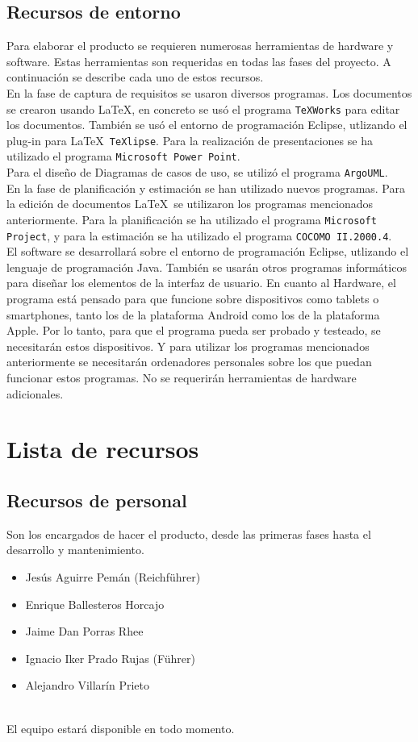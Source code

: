 \documentclass[spanish,a4paper,12pt]{report}	%
\begin{document}
		\subsection{Recursos de entorno}
			Para elaborar el producto se requieren numerosas herramientas de hardware y
			software. Estas herramientas son requeridas en todas las fases del proyecto. 
			A continuación se describe cada uno de estos recursos.  \\
			En la fase de captura de requisitos se usaron diversos programas. Los documentos
			se crearon usando \LaTeX , en concreto se usó el programa \texttt{TeXWorks} para editar los documentos.
			También se usó el entorno de programación Eclipse, utlizando el plug-in para \LaTeX\  \texttt{TeXlipse}. 
			Para la realización de presentaciones se ha utilizado el programa \texttt{Microsoft Power Point}.\\
			Para el diseño de Diagramas de casos de uso, se utilizó el programa \texttt{ArgoUML}.\\
			En la fase de planificación y estimación se han utilizado nuevos programas. Para la edición de documentos
			\LaTeX  \ se utilizaron los programas mencionados anteriormente. Para la planificación se ha utilizado el programa
			\texttt{Microsoft Project}, y para la estimación se ha utilizado el programa \texttt{COCOMO II.2000.4}.\\ 
			El software se desarrollará sobre el entorno de
			programación Eclipse, utlizando el lenguaje de programación Java. También se
			usarán otros programas informáticos para diseñar los elementos de la interfaz de
			usuario. En cuanto al Hardware, el programa está pensado para que funcione sobre dispositivos como
			tablets o smartphones, tanto los de la plataforma Android como los de la
			plataforma Apple. Por lo tanto, para que el programa pueda ser probado y
			testeado, se necesitarán estos dispositivos. Y para utilizar los programas mencionados anteriormente
			se necesitarán ordenadores personales sobre los que puedan funcionar estos programas.
			No se requerirán herramientas de
			hardware adicionales.


	\section{Lista de recursos}
		\subsection*{Recursos de personal}
			Son los encargados de hacer el producto, desde las primeras fases hasta el desarrollo y mantenimiento.\\
			\begin{itemize}
			  \item Jesús Aguirre Pemán (Reichführer)
			  \item Enrique Ballesteros Horcajo
			  \item Jaime Dan Porras Rhee
			  \item Ignacio Iker Prado Rujas (Führer)
			  \item Alejandro Villarín Prieto
			\end{itemize}\ \\
			El equipo estará disponible en todo momento.
\end{document}
